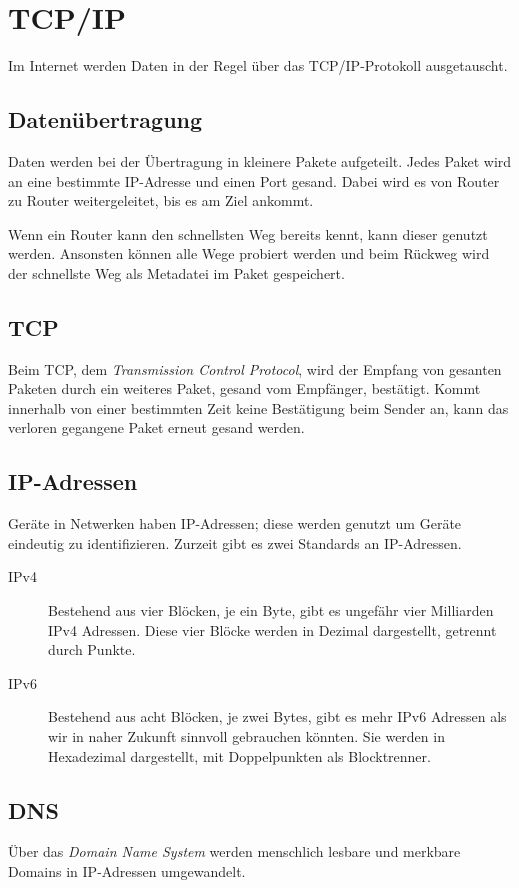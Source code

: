 \documentclass{article}
\begin{document}
\section{TCP/IP} 
Im Internet werden Daten in der Regel über das TCP/IP-Protokoll ausgetauscht.

\subsection{Datenübertragung}
Daten werden bei der Übertragung in kleinere Pakete aufgeteilt. Jedes Paket wird an eine bestimmte IP-Adresse und einen Port gesand. Dabei wird es von Router zu Router weitergeleitet, bis es am Ziel ankommt.

Wenn ein Router kann den schnellsten Weg bereits kennt, kann dieser genutzt werden. Ansonsten können alle Wege probiert werden und beim Rückweg wird der schnellste Weg als Metadatei im Paket gespeichert.

\subsection{TCP}
Beim TCP, dem \emph{Transmission Control Protocol}, wird der Empfang von gesanten Paketen durch ein weiteres Paket, gesand vom Empfänger, bestätigt. Kommt innerhalb von einer bestimmten Zeit keine Bestätigung beim Sender an, kann das verloren gegangene Paket erneut gesand werden.

\subsection{IP-Adressen}
Geräte in Netwerken haben IP-Adressen; diese werden genutzt um Geräte eindeutig zu identifizieren. Zurzeit gibt es zwei Standards an IP-Adressen.
\begin{description}
 \item[IPv4] Bestehend aus vier Blöcken, je ein Byte, gibt es ungefähr vier Milliarden IPv4 Adressen. Diese vier Blöcke werden in Dezimal dargestellt, getrennt durch Punkte.
 \item[IPv6] Bestehend aus acht Blöcken, je zwei Bytes, gibt es mehr IPv6 Adressen als wir in naher Zukunft sinnvoll gebrauchen könnten. Sie werden in Hexadezimal dargestellt, mit Doppelpunkten als Blocktrenner.
\end{description}

\subsection{DNS}
Über das \emph{Domain Name System} werden menschlich lesbare und merkbare Domains in IP-Adressen umgewandelt.
\end{document}
